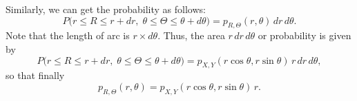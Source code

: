 Similarly, we can get the probability as follows:
\[
P\!\bigl(r\le R\le r+dr,\;
        \theta\le\Theta\le\theta+d\theta\bigr)
  = p_{R,\Theta}(r,\theta)\,dr\,d\theta.
\tag{7}
\]
Note that the length of arc is $r\times d\theta$. Thus, the area $r\,dr\,d\theta$ or probability is given by
\[
P\!\bigl(r\le R\le r+dr,\;
        \theta\le\Theta\le\theta+d\theta\bigr)
  = p_{X,Y}(r\cos\theta, r\sin\theta)\,r\,dr\,d\theta,
\tag{8--9}
\]
so that finally
\[
p_{R,\Theta}(r,\theta)
  = p_{X,Y}(r\cos\theta, r\sin\theta)\,r.
\tag{10}
\]

